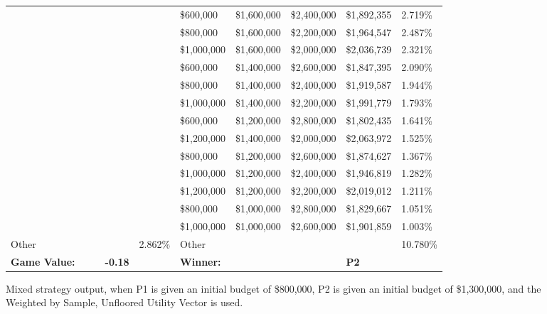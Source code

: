 \documentclass[11pt]{article}
\begin{document}
\begin{figure}
\begin{tabular}{ |p{1.0cm}p{1.0cm}p{1.0cm}p{2.0cm}|p{1.0cm}||p{1.0cm}p{1.0cm}p{1.0cm}p{2.0cm}|p{1.0cm}|}
&&&& & \$600,000 & \$1,600,000 & \$2,400,000 & \$1,892,355 & 2.719\% \\
&&&& & \$800,000 & \$1,600,000 & \$2,200,000 & \$1,964,547 & 2.487\% \\
&&&& & \$1,000,000 & \$1,600,000 & \$2,000,000 & \$2,036,739 & 2.321\% \\
&&&& & \$600,000 & \$1,400,000 & \$2,600,000 & \$1,847,395 & 2.090\% \\
&&&& & \$800,000 & \$1,400,000 & \$2,400,000 & \$1,919,587 & 1.944\% \\
&&&& & \$1,000,000 & \$1,400,000 & \$2,200,000 & \$1,991,779 & 1.793\% \\
&&&& & \$600,000 & \$1,200,000 & \$2,800,000 & \$1,802,435 & 1.641\% \\
&&&& & \$1,200,000 & \$1,400,000 & \$2,000,000 & \$2,063,972 & 1.525\% \\
&&&& & \$800,000 & \$1,200,000 & \$2,600,000 & \$1,874,627 & 1.367\% \\
&&&& & \$1,000,000 & \$1,200,000 & \$2,400,000 & \$1,946,819 & 1.282\% \\
&&&& & \$1,200,000 & \$1,200,000 & \$2,200,000 & \$2,019,012 & 1.211\% \\
&&&& & \$800,000 & \$1,000,000 & \$2,800,000 & \$1,829,667 & 1.051\% \\
&&&& & \$1,000,000 & \$1,000,000 & \$2,600,000 & \$1,901,859 & 1.003\% \\
\hline
Other &&&& 2.862\% & Other &&&& 10.780\% \\
\hline
\small \textbf{Game Value:} &&& \small \textbf{-0.18} && \small \textbf{Winner:} &&& \small \textbf{P2}&\\
\hline
\end{tabular}
\caption{Mixed strategy output, when P1 is given an initial budget of \$800,000, P2 is given an initial budget of \$1,300,000, and the Weighted by Sample, Unfloored Utility Vector is used.}
\label{8v13table.6}
\end{figure}
\end{document}
